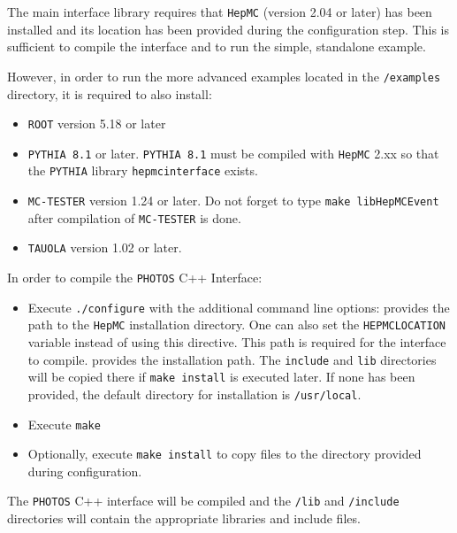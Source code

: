 \documentclass[]{Photos_interface_design}
\begin{document}
The main interface library requires that {\tt HepMC} \cite{Dobbs:2001ck} (version 2.04 or later)  has been installed
and its location has been provided during the configuration step. This is sufficient to compile the interface and to run the simple, standalone example.

However, in order to run the more advanced examples located in the {\tt /examples} directory, it is required to also install:

\begin{itemize}
  \item {\tt ROOT} \cite{root-install-www} version 5.18 or later
  \item {\tt PYTHIA 8.1} \cite{Sjostrand:2007gs} or later. {\tt PYTHIA 8.1} must be compiled with {\tt HepMC} 2.xx
        so that the {\tt PYTHIA} library {\tt hepmcinterface} exists.
  \item {\tt MC-TESTER} \cite{Golonka:2002rz,Davidson:2008ma} version 1.24 or later.
        Do not forget to type {\tt make libHepMCEvent} after compilation of {\tt MC-TESTER} is done.
  \item {\tt TAUOLA} \cite{Davidson:2010rw} version 1.02 or later.
\end{itemize}

In order to compile the {\tt PHOTOS} C++ Interface:
\begin{itemize}
 \item Execute {\tt ./configure} with the additional command line options:
    provides the path to the {\tt HepMC} installation directory. One can also set the {\tt HEPMCLOCATION} variable instead of using this directive. This path is required for the interface to compile.
    provides the installation path. The {\tt include} and {\tt lib} directories will be copied there if {\tt make install} is executed later. If none has been provided, the default directory for installation is {\tt /usr/local}.
 \item Execute {\tt make}
 \item Optionally, execute {\tt make install} to copy files to the directory provided during configuration.
\end{itemize}

The {\tt PHOTOS} C++ interface will be compiled and the {\tt /lib} and {\tt /include} directories will contain the appropriate libraries and include files.
\end{document}
